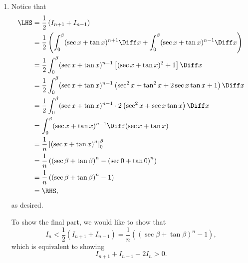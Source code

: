 \Question{\currfilebase}
\begin{enumerate}
    \item Notice that
          \begin{align*}
              \LHS & = \frac{1}{2} \left(I_{n + 1} + I_{n - 1}\right)                                                                                   \\
                   & = \frac{1}{2} \left(\int_{0}^{\beta} (\sec x + \tan x)^{n + 1} \Diff x + \int_{0}^{\beta} (\sec x + \tan x)^{n - 1} \Diff x\right) \\
                   & = \frac{1}{2} \int_{0}^{\beta} (\sec x + \tan x)^{n - 1} \left[(\sec x + \tan x)^2 + 1\right] \Diff x                              \\
                   & = \frac{1}{2} \int_{0}^{\beta} (\sec x + \tan x)^{n - 1} \left(\sec^2 x + \tan^2 x + 2 \sec x \tan x + 1\right) \Diff x            \\
                   & = \frac{1}{2} \int_{0}^{\beta} (\sec x + \tan x)^{n - 1} \cdot 2\left(\sec^2 x + \sec x \tan x\right) \Diff x                      \\
                   & = \int_{0}^{\beta} (\sec x + \tan x)^{n - 1} \Diff (\sec x + \tan x)                                                               \\
                   & = \frac{1}{n} \left[\left(\sec x + \tan x\right)^{n}\right]_{0}^{\beta}                                                            \\
                   & = \frac{1}{n} \left(\left(\sec \beta + \tan \beta\right)^{n} - \left(\sec 0 + \tan 0\right)^{n}\right)                             \\
                   & = \frac{1}{n} \left(\left(\sec \beta + \tan \beta\right)^{n} - 1 \right)                                                           \\
                   & = \RHS,
          \end{align*}
          as desired.

          To show the final part, we would like to show that
          \[
              I_n < \frac{1}{2} \left(I_{n + 1} + I_{n - 1}\right) = \frac{1}{n} \left(\left(\sec \beta + \tan \beta\right)^{n} - 1 \right),
          \]
          which is equivalent to showing
          \[
              I_{n + 1} + I_{n - 1} - 2 I_n > 0.
          \]


\end{enumerate}
